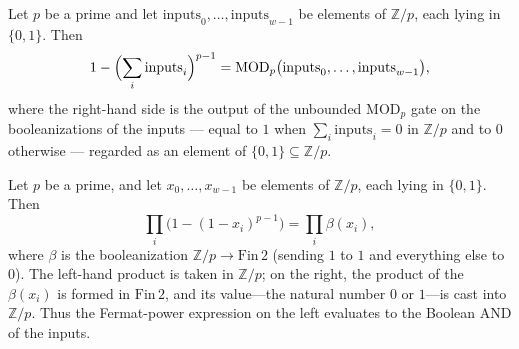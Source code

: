 \begin{lemma}
\label{RazborovSmolensky.exactMod_on_bits}
\leanok
{}
Let $p$ be a prime and let $\mathrm{inputs}_0, \dots, \mathrm{inputs}_{w-1}$ be elements
of $\mathbb{Z}/p$, each lying in $\{0,1\}$. Then
\[
1 - \Bigl(\sum_{i} \mathrm{inputs}_i\Bigr)^{p-1} =
\operatorname{MOD}_p\bigl(\mathrm{inputs}_0, \dots, \mathrm{inputs}_{w-1}\bigr),
\]
where the right-hand side is the output of the unbounded $\mathrm{MOD}_p$ gate on the
booleanizations of the inputs — equal to $1$ when $\sum_i \mathrm{inputs}_i = 0$ in
$\mathbb{Z}/p$ and to $0$ otherwise — regarded as an element of $\{0,1\} \subseteq
\mathbb{Z}/p$.
\end{lemma}

\begin{lemma}
\label{RazborovSmolensky.exactAnd_on_bits}
\leanok
{}
Let $p$ be a prime, and let $x_0,\dots,x_{w-1}$ be elements of $\mathbb{Z}/p$, each
lying in $\{0,1\}$. Then
\[
\prod_i \bigl(1 - (1 - x_i)^{p-1}\bigr) = \prod_i \beta(x_i),
\]
where $\beta$ is the booleanization $\mathbb{Z}/p \to \mathrm{Fin}\,2$ (sending $1$ to
$1$ and everything else to $0$). The left-hand product is taken in $\mathbb{Z}/p$; on
the right, the product of the $\beta(x_i)$ is formed in $\mathrm{Fin}\,2$, and its
value—the natural number $0$ or $1$—is cast into $\mathbb{Z}/p$. Thus the Fermat-power
expression on the left evaluates to the Boolean AND of the inputs.
\end{lemma}


